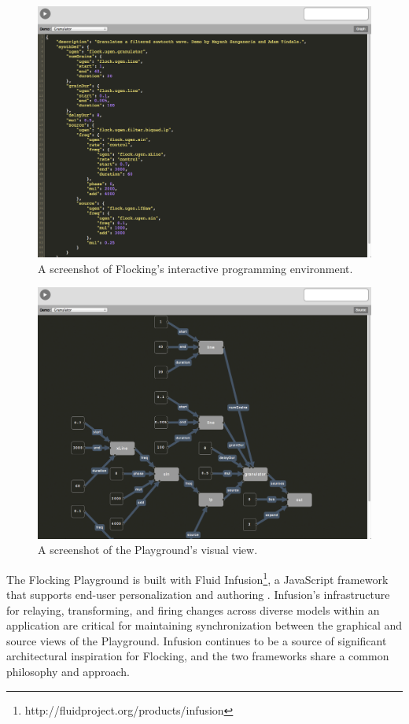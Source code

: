 \documentclass{article}
\begin{document}
\begin{figure}[ht!]
\centering
\includegraphics[width=0.9\columnwidth]{images/flocking-playground-source-view.png}
\caption{ A screenshot of Flocking's interactive programming environment.\label{fig:playground}}
\end{figure}

\begin{figure}[ht]
\centering
\includegraphics[width=0.9\columnwidth]{images/flocking-playground-graphical-view.png}
\caption{ A screenshot of the Playground's visual view.\label{fig:graphical}}
\end{figure}

The Flocking Playground is built with Fluid Infusion\footnote{http://fluidproject.org/products/infusion}, a JavaScript framework that supports end-user personalization and authoring \cite{hcii2014}. Infusion's infrastructure for relaying, transforming, and firing changes across diverse models within an application are critical for maintaining synchronization between the graphical and source views of the Playground. Infusion continues to be a source of significant architectural inspiration for Flocking, and the two frameworks share a common philosophy and approach.
\end{document}
